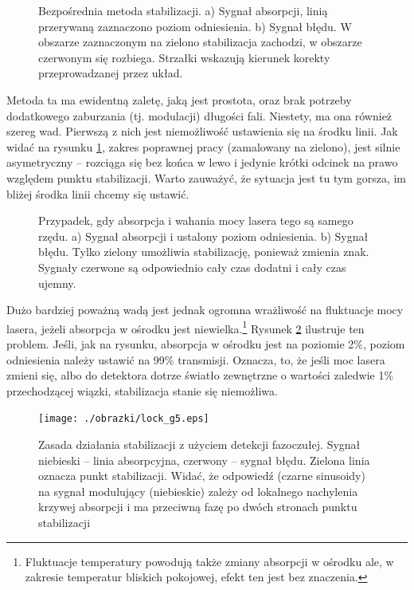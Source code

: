 \documentclass[a4paper,10pt]{article}
\begin{document}
\begin{figure}[h!]
\caption{Bezpośrednia metoda stabilizacji. a) Sygnał absorpcji, linią przerywaną zaznaczono poziom odniesienia. b) Sygnał błędu. W obszarze zaznaczonym na zielono stabilizacja zachodzi, w obszarze czerwonym się rozbiega. Strzałki wskazują kierunek korekty przeprowadzanej przez układ.}
\label{fig:lock1}
\end{figure} 

Metoda ta ma ewidentną zaletę, jaką jest prostota, oraz brak potrzeby dodatkowego zaburzania (tj. modulacji) długości fali.
Niestety, ma ona również szereg wad. Pierwszą z nich jest niemożliwość ustawienia się na środku linii. Jak widać na
rysunku \ref{fig:lock1}, zakres poprawnej pracy (zamalowany na zielono), jest silnie asymetryczny -- rozciąga się 
bez końca w lewo i jedynie krótki odcinek na prawo względem punktu stabilizacji. Warto zauważyć, że sytuacja jest tu tym gorsza, im
bliżej środka linii chcemy się ustawić.

\begin{figure}[h!]
\caption{Przypadek, gdy absorpcja i wahania mocy lasera tego są samego rzędu. a) Sygnał absorpcji i ustalony poziom odniesienia. b) Sygnał błędu. Tylko zielony umożliwia stabilizację, ponieważ zmienia znak. Sygnały czerwone są odpowiednio cały czas dodatni i cały czas ujemny. }
\label{fig:lock2}
\end{figure} 


Dużo bardziej poważną wadą jest jednak ogromna wrażliwość na fluktuacje mocy lasera, jeżeli absorpcja w ośrodku jest niewielka.\footnote{Fluktuacje temperatury powodują także zmiany absorpcji w ośrodku ale, w zakresie temperatur bliskich pokojowej, efekt ten jest bez znaczenia.} 
Rysunek \ref{fig:lock2} ilustruje ten problem. Jeśli, jak na rysunku, absorpcja w ośrodku jest na poziomie 2\%, poziom odniesienia
należy ustawić na 99\% transmisji. Oznacza, to, że jeśli moc lasera zmieni się, albo do detektora dotrze światło zewnętrzne o wartości
zaledwie 1\% przechodzącej wiązki, stabilizacja stanie się niemożliwa.

\begin{figure}

\texttt{[image: ./obrazki/lock\_g5.eps]}
\caption{Zasada działania stabilizacji z użyciem detekcji fazoczułej. Sygnał niebieski -- linia absorpcyjna, czerwony -- sygnał błędu. Zielona linia oznacza punkt stabilizacji. Widać, że odpowiedź (czarne sinusoidy) na sygnał modulujący (niebieskie) zależy od lokalnego nachylenia krzywej absorpcji i ma przeciwną fazę po dwóch stronach punktu stabilizacji}
\label{fig:lock3}
\end{figure} 
\end{document}
